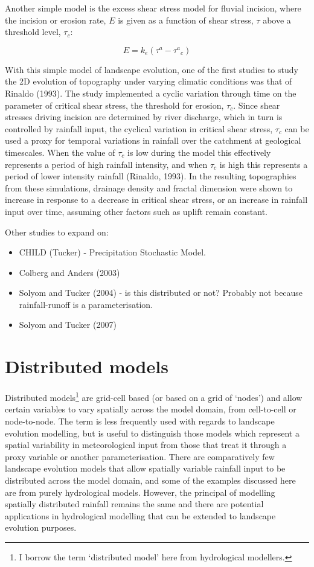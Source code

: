 \documentclass[12pt,oneside,PhD]{muthesis}
\begin{document}
Another simple model is the excess shear stress model for fluvial incision, where the incision or erosion rate, \(E\) is given as a function of shear stress, \(\tau\) above a threshold level, \(\tau_c\):

\begin{equation}
E = k_e(\tau^a -  {\tau^a}_c)
\end{equation}

With this simple model of landscape evolution, one of the first studies to study the 2D evolution of topography under varying climatic conditions was that of Rinaldo (1993). The study implemented a cyclic variation through time on the parameter of critical shear stress, the threshold for erosion, \(\tau_c\). Since shear stresses driving incision are determined by river discharge, which in turn is controlled by rainfall input, the cyclical variation in critical shear stress, \(\tau_c\) can be used a proxy for temporal variations in rainfall over the catchment at geological timescales. When the value of \(\tau_c\) is low during the model this effectively represents a period of high rainfall intensity, and when \(\tau_c\) is high this represents a period of lower intensity rainfall (Rinaldo, 1993). In the resulting topographies from these simulations, drainage density and fractal dimension were shown to increase in response to a decrease in critical shear stress, or an increase in rainfall input over time, assuming other factors such as uplift remain constant.

Other studies to expand on:
\begin{itemize}
\item CHILD (Tucker) - Precipitation Stochastic Model.
\item Colberg and Anders (2003)
\item Solyom and Tucker (2004) - is this distributed or not? Probably not because rainfall-runoff is a parameterisation.
\item Solyom and Tucker (2007)
\end{itemize}

\section{Distributed models}
Distributed models\footnote{I borrow the term `distributed model' here from hydrological modellers.} are grid-cell based (or based on a grid of `nodes') and allow certain variables to vary spatially across the model domain, from cell-to-cell or node-to-node. The term is less frequently used with regards to landscape evolution modelling, but is useful to distinguish those models which represent a spatial variability in meteorological input from those that treat it through a proxy variable or another parameterisation. There are comparatively few landscape evolution models that allow spatially variable rainfall input to be distributed across the model domain, and some of the examples discussed here are from purely hydrological models. However, the principal of modelling spatially distributed rainfall remains the same and there are potential applications in hydrological modelling that can be extended to landscape evolution purposes. 
\end{document}
